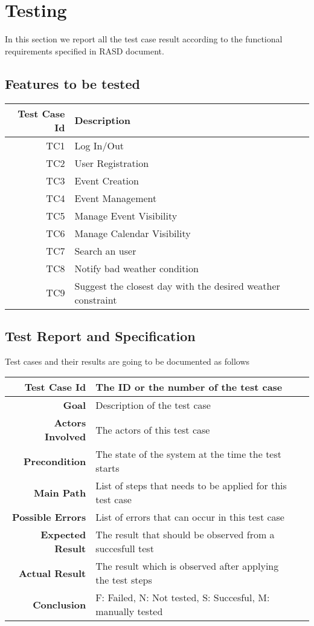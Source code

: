 \chapter{Testing} \label{cap:cap2}
In this section we report all the test case result according to the functional requirements specified in RASD document.

 \section{Features to be tested}
 \begin{tabularx}{\linewidth}{|r|X|X|}
  \hline  {\bf Test Case Id} &{\bf Description}\\
  \hline TC1 & Log In/Out \\
  \hline TC2 & User Registration \\
  \hline TC3 & Event Creation \\
  \hline TC4 & Event Management \\
  \hline TC5 & Manage Event Visibility \\
  \hline TC6 & Manage Calendar Visibility \\
  \hline TC7 & Search an user \\
  \hline TC8 & Notify bad weather condition \\ 
  \hline TC9 & Suggest the closest day with the desired weather constraint \\
  \hline
\end{tabularx}
 
\section{Test Report and Specification}
Test cases and their results are going to be documented as follows\\
\begin{tabularx}{\linewidth}{|r|X|X|}
  \hline   {\bf Test Case Id} &  The ID or the number of the test case\\
  \hline  {\bf Goal} & Description of the test case\\
  \hline  {\bf Actors Involved} & The actors of this test case\\
  \hline  {\bf Precondition} & The state of the system at the time the test starts\\ 
   \hline  {\bf Main Path} & List of steps that needs to be applied for this test case\\
   \hline  {\bf Possible Errors} & List of errors that can occur in this test case\\
  \hline  {\bf Expected Result} & The result that should be observed from a succesfull test\\
  \hline  {\bf Actual Result} & The result which is observed after applying the test steps\\
  \hline  {\bf Conclusion} & F: Failed, N: Not tested, S: Succesful, M: manually tested\\
  \hline
\end{tabularx}


